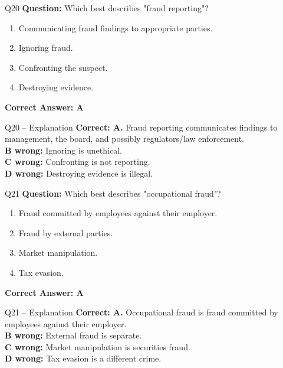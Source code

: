 \documentclass[aspectratio=169,10pt]{beamer}
\begin{document}
	\begin{frame}[t]{Q20}
		\small
		\textbf{Question:} Which best describes "fraud reporting"?
		\begin{enumerate}[label=\Alph*.,itemsep=1pt,topsep=2pt]
			\item Communicating fraud findings to appropriate parties.
			\item Ignoring fraud.
			\item Confronting the suspect.
			\item Destroying evidence.
		\end{enumerate}
		\vspace{4pt}
		\textbf{Correct Answer: A}
	\end{frame}
	
	\begin{frame}[t]{Q20 -- Explanation}
		\small
		\textbf{Correct: A.} Fraud reporting communicates findings to management, the board, and possibly regulators/law enforcement. \\[4pt]
		\textbf{B wrong:} Ignoring is unethical. \\[2pt]
		\textbf{C wrong:} Confronting is not reporting. \\[2pt]
		\textbf{D wrong:} Destroying evidence is illegal.
	\end{frame}
	
	\begin{frame}[t]{Q21}
		\small
		\textbf{Question:} Which best describes "occupational fraud"?
		\begin{enumerate}[label=\Alph*.,itemsep=1pt,topsep=2pt]
			\item Fraud committed by employees against their employer.
			\item Fraud by external parties.
			\item Market manipulation.
			\item Tax evasion.
		\end{enumerate}
		\vspace{4pt}
		\textbf{Correct Answer: A}
	\end{frame}
	
	\begin{frame}[t]{Q21 -- Explanation}
		\small
		\textbf{Correct: A.} Occupational fraud is fraud committed by employees against their employer. \\[4pt]
		\textbf{B wrong:} External fraud is separate. \\[2pt]
		\textbf{C wrong:} Market manipulation is securities fraud. \\[2pt]
		\textbf{D wrong:} Tax evasion is a different crime.
	\end{frame}
	
\end{document}
